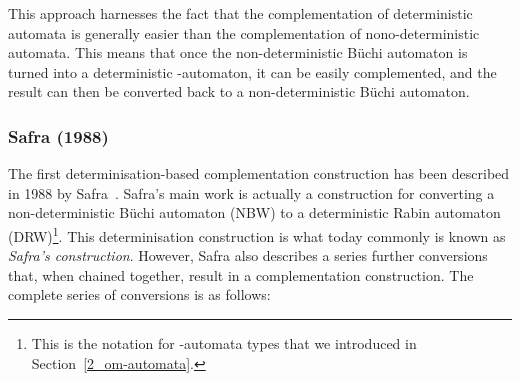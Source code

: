 This approach harnesses the fact that the complementation of deterministic automata is generally easier than the complementation of nono-deterministic automata. This means that once the non-deterministic Büchi automaton is turned into a deterministic \om-automaton, it can be easily complemented, and the result can then be converted back to a non-deterministic Büchi automaton.




\subsubsection{Safra (1988)}
\label{2_safra88}
The first determinisation-based complementation construction has been described in 1988 by Safra~\cite{1988_safra_2,1988_safra_1}. Safra's main work is actually a construction for converting a non-deterministic Büchi automaton (NBW) to a deterministic Rabin automaton (DRW)\footnote{This is the notation for \om-automata types that we introduced in Section~\ref{2_om-automata}.}. This determinisation construction is what today commonly is known as \textit{Safra's construction}. However, Safra also describes a series further conversions that, when chained together, result in a complementation construction. The complete series of conversions is as follows:


